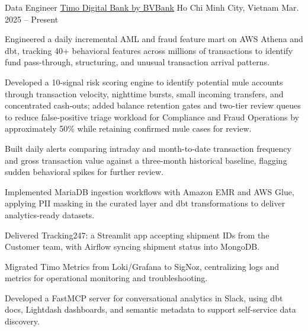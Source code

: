 
\begin{cventries}
  \cventry
    {Data Engineer}
    {\href{https://timo.vn}{Timo Digital Bank by BVBank}}
    {Ho Chi Minh City, Vietnam}
    {Mar. 2025 -- Present}
    {
      \begin{cvitems}
        \item {Engineered a daily incremental AML and fraud feature mart on AWS Athena and dbt, tracking 40+ behavioral features across millions of transactions to identify fund pass-through, structuring, and unusual transaction arrival patterns.}
        \item {Developed a 10-signal risk scoring engine to identify potential mule accounts through transaction velocity, nighttime bursts, small incoming transfers, and concentrated cash-outs; added balance retention gates and two-tier review queues to reduce false-positive triage workload for Compliance and Fraud Operations by approximately 50\% while retaining confirmed mule cases for review.}
        \item {Built daily alerts comparing intraday and month-to-date transaction frequency and gross transaction value against a three-month historical baseline, flagging sudden behavioral spikes for further review.}
        \item {Implemented MariaDB ingestion workflows with Amazon EMR and AWS Glue, applying PII masking in the curated layer and dbt transformations to deliver analytics-ready datasets.}
        \item {Delivered Tracking247: a Streamlit app accepting shipment IDs from the Customer team, with Airflow syncing shipment status into MongoDB.}
        \item {Migrated Timo Metrics from Loki/Grafana to SigNoz, centralizing logs and metrics for operational monitoring and troubleshooting.}
        \item {Developed a FastMCP server for conversational analytics in Slack, using dbt docs, Lightdash dashboards, and semantic metadata to support self-service data discovery.}
      \end{cvitems}
    }
\end{cventries}
